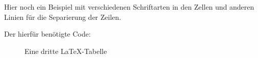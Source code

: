 Hier noch ein Beispiel mit verschiedenen Schriftarten in den Zellen und anderen Linien für die Separierung der Zeilen.



\newpage
Der hierfür benötigte Code:

\begin{figure}[h!]
    \centering
      \caption{Eine dritte LaTeX-Tabelle}
\end{figure} 
